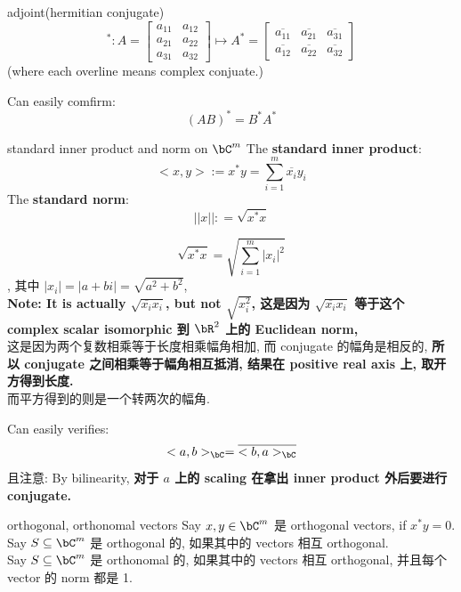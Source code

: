 \documentclass[lang=cn,11pt]{elegantbook}
\begin{document}
\begin{definition}{adjoint(hermitian conjugate)}
\[
    ^*:
    A = \begin{bmatrix} a_{11} & a_{12} \\ a_{21} & a_{22}   \\a_{31} & a_{32}  \end{bmatrix}
    \mapsto A^* =  \begin{bmatrix} \overline{a_{11}} & \overline{a_{21}}  &\overline{a_{31}} \\ \overline{a_{12}} & \overline{a_{22}} & \overline{a_{32}}   \end{bmatrix}
    \]
(where each overline means complex conjuate.)
\end{definition}
\begin{remark}
    Can easily comfirm:
    $$
    (AB)^* = B^* A^*
    $$
\end{remark}



\begin{definition}{standard inner product and norm on $\bC^m$}
The \textbf{standard inner product}:
$$
<x,y> := x^* y  = \sum_{i=1}^m \overline{x_i} y_i
$$
The \textbf{standard norm}:
$$
||x|| : =  \sqrt{x^* x}
$$
\end{definition}
\begin{remark}
$$
\sqrt{x^* x} = \sqrt{\sum_{i=1}^m |x_i|^2}
$$, 其中 $|x_i| = |a+ bi| = \sqrt{a^2 + b^2}$, \\
\textbf{Note: It is actually $\sqrt{\overline{x_i} x_i}$, but not $\sqrt{x_i^2}$, 这是因为 $\sqrt{\overline{x_i} x_i}$ 等于这个 complex scalar isomorphic 到 $\bR^2$ 上的 Euclidean norm,}\\ 
这是因为两个复数相乘等于长度相乘幅角相加, 而 conjugate 的幅角是相反的, \textbf{所以 conjugate 之间相乘等于幅角相互抵消, 结果在 positive real axis 上, 取开方得到长度.} \\
而平方得到的则是一个转两次的幅角.
\end{remark}
\begin{remark}
    Can easily verifies:
    $$
    <a,b>_{\bC} = \overline{<b,a>_{\bC}}
    $$
    且注意: By bilinearity, \textbf{对于 $a$ 上的 scaling 在拿出 inner product 外后要进行 conjugate.}
\end{remark}

\begin{definition}{orthogonal, orthonomal vectors}
    Say $x, y \in \bC^m$ 是 orthogonal vectors, if $x^* y = 0$.\\
    Say $S \sub \bC^m$ 是 orthogonal 的, 如果其中的 vectors 相互 orthogonal.\\
    Say $S \sub \bC^m$ 是 orthonomal 的, 如果其中的 vectors 相互 orthogonal, 并且每个 vector 的 norm 都是 1.
\end{definition}
\end{document}
